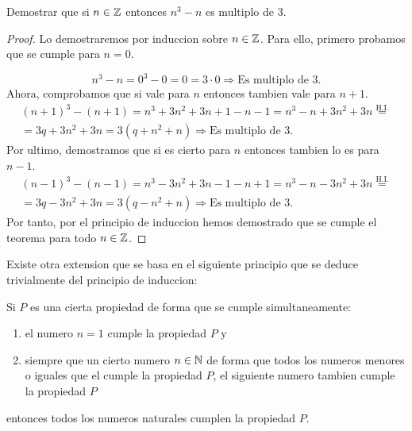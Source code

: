 \begin{example}
	Demostrar que si \(n \in  \mathbb{Z} \) entonces \(n^{3} - n \) es multiplo de 3.
\end{example}
\begin{proof}
	Lo demostraremos por induccion sobre \(n \in \mathbb{Z}\). Para ello, primero probamos que se cumple para \(n = 0\).
	
	\[
		n^{3} - n = 0^{3} - 0 = 0 = 3 \cdot 0 \Rightarrow \text{Es multiplo de 3.}
	\]
	Ahora, comprobamos que si vale para \(n \) entonces tambien vale para \(n + 1 \).
	\begin{multline*}
		(n+1)^{3} - (n+1) = n^{3} + 3n^{2} + 3n + 1 - n - 1 = n^{3} - n + 3n^{2} + 3n \overset{\text{H.I.} }{=} \\
		= 3q + 3n^{2} + 3n = 3(q + n^{2} + n) \Rightarrow \text{Es multiplo de 3. }
	\end{multline*}
	Por ultimo, demostramos que si es cierto para \(n\) entonces tambien lo es para \(n - 1 \).
	\begin{multline*}
		(n-1)^{3} - (n-1) = n^{3} - 3n^{2} + 3n - 1 - n + 1 = n^{3} - n - 3n^{2} + 3n \overset{\text{H.I.}}{=} \\ =  3q - 3n^{2} + 3n = 3(q - n^{2} + n) \Rightarrow \text{Es multiplo de 3.}
	\end{multline*}
	Por tanto, por el principio de induccion hemos demostrado que se cumple el teorema para todo \(n \in \mathbb{Z} \).
\end{proof}

Existe otra extension que se basa en el siguiente principio que se deduce trivialmente del principio de induccion:
\begin{proposition}
	Si \(P \) es una cierta propiedad de forma que se cumple simultaneamente:
	\begin{enumerate}
		\item el numero \(n = 1 \) cumple la propiedad \(P \)  y
		\item siempre que un cierto numero \(n \in  \mathbb{N} \) de forma que todos los numeros menores o iguales que el cumple la propiedad \(P \), el siguiente numero tambien cumple la propiedad \(P \)
	\end{enumerate}
	entonces todos los numeros naturales cumplen la propiedad \(P \).
\end{proposition}

